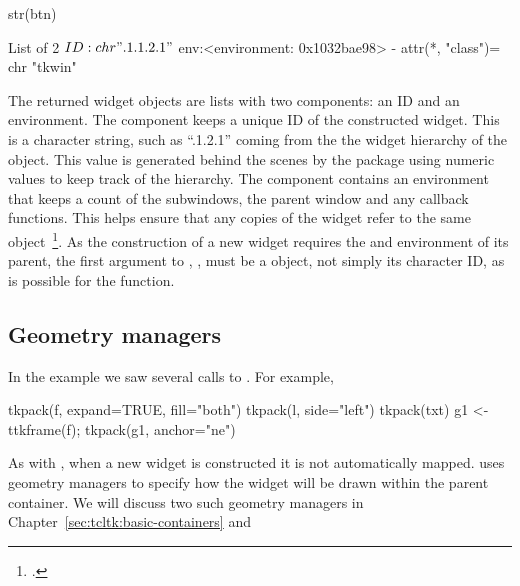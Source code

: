 \begin{Schunk}
\begin{Sinput}
 str(btn)
\end{Sinput}
\begin{Soutput}
List of 2
 $ ID : chr ".1.1.2.1"
 $ env:<environment: 0x1032bae98> 
 - attr(*, "class")= chr "tkwin"
\end{Soutput}
\end{Schunk}

The returned widget objects are lists with two components: an ID and an
environment. The  component keeps a unique ID of the
constructed widget. This is a character string, such as ``.1.2.1''
coming from the the widget hierarchy of the object. This value is
generated behind the scenes by the  package using numeric
values to keep track of the hierarchy. The  component
contains an environment that keeps a count of the subwindows, the parent
window and any callback functions. This helps ensure that any copies
of the widget refer to the same object~\footcite{Dalgaard-DSC}. As the
construction of a new widget requires the  and environment of
its parent, the first argument to , ,
must be a  object, not simply its character ID, as is
possible for the  function.


\subsection{Geometry managers}
\label{sec:tcltk:overview:geometry-managers}

In the example we saw several calls to . For example,

\begin{Schunk}
\begin{Sinput}
 tkpack(f, expand=TRUE, fill="both")
 tkpack(l, side="left")
 tkpack(txt)
 g1 <- ttkframe(f); tkpack(g1, anchor="ne")
\end{Sinput}
\end{Schunk}


As with \Qt, when a new widget is constructed it is not automatically
mapped. \TK\/ uses geometry managers to specify how the widget will be
drawn within the parent container. We will discuss two such geometry
managers in Chapter~\ref{sec:tcltk:basic-containers}  and 

